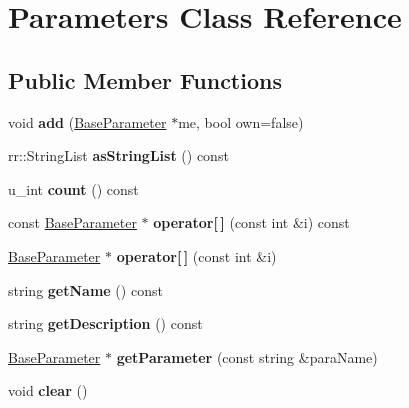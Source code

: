 \hypertarget{classrrp_1_1_parameters}{\section{Parameters Class Reference}
\label{classrrp_1_1_parameters}
}
\subsection*{Public Member Functions}
\begin{DoxyCompactItemize}
\item 
\hypertarget{classrrp_1_1_parameters_a5e23b00da420f6d5eec38df5235d2d44}{void {\bfseries add} (\hyperlink{classrrp_1_1_base_parameter}{Base\-Parameter} $\ast$me, bool own=false)}\label{classrrp_1_1_parameters_a5e23b00da420f6d5eec38df5235d2d44}

\item 
\hypertarget{classrrp_1_1_parameters_a86fa5fe4e31af55cb6089167fda68b62}{rr\-::\-String\-List {\bfseries as\-String\-List} () const }\label{classrrp_1_1_parameters_a86fa5fe4e31af55cb6089167fda68b62}

\item 
\hypertarget{classrrp_1_1_parameters_aff9a0828403fe471f46a60fe64c52170}{u\-\_\-int {\bfseries count} () const }\label{classrrp_1_1_parameters_aff9a0828403fe471f46a60fe64c52170}

\item 
\hypertarget{classrrp_1_1_parameters_a5426a8465fa80a98a41f5ea1357fc8d4}{const \hyperlink{classrrp_1_1_base_parameter}{Base\-Parameter} $\ast$ {\bfseries operator\mbox{[}$\,$\mbox{]}} (const int \&i) const }\label{classrrp_1_1_parameters_a5426a8465fa80a98a41f5ea1357fc8d4}

\item 
\hypertarget{classrrp_1_1_parameters_a2d095fd026145644eadede01ba4294dd}{\hyperlink{classrrp_1_1_base_parameter}{Base\-Parameter} $\ast$ {\bfseries operator\mbox{[}$\,$\mbox{]}} (const int \&i)}\label{classrrp_1_1_parameters_a2d095fd026145644eadede01ba4294dd}

\item 
\hypertarget{classrrp_1_1_parameters_a5e164ba33b1dfc211559756aa5d486c0}{string {\bfseries get\-Name} () const }\label{classrrp_1_1_parameters_a5e164ba33b1dfc211559756aa5d486c0}

\item 
\hypertarget{classrrp_1_1_parameters_a2c1ef8f0b4bd34b381de63dc9a390203}{string {\bfseries get\-Description} () const }\label{classrrp_1_1_parameters_a2c1ef8f0b4bd34b381de63dc9a390203}

\item 
\hypertarget{classrrp_1_1_parameters_a3313ee15c4be475bbfe6f34e3590f8d6}{\hyperlink{classrrp_1_1_base_parameter}{Base\-Parameter} $\ast$ {\bfseries get\-Parameter} (const string \&para\-Name)}\label{classrrp_1_1_parameters_a3313ee15c4be475bbfe6f34e3590f8d6}

\item 
\hypertarget{classrrp_1_1_parameters_ac8bb3912a3ce86b15842e79d0b421204}{void {\bfseries clear} ()}\label{classrrp_1_1_parameters_ac8bb3912a3ce86b15842e79d0b421204}

\end{DoxyCompactItemize}
